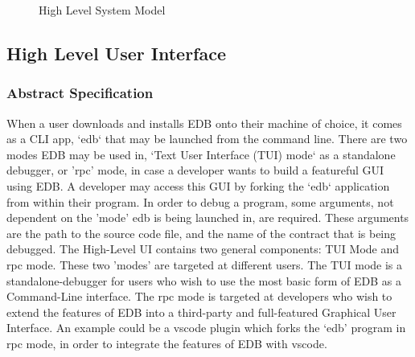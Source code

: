 \documentclass{report}
\begin{document}
\begin{figure}[!h]
    \vspace*{1cm}

    \caption{High Level System Model}
\end{figure}
\newpage

\subsection{High Level User Interface}
\subsubsection{Abstract Specification}
    When a user downloads and installs EDB onto their machine of choice, it comes as a CLI app, `edb` that may be launched from the command line. There are two modes EDB may be used in, `Text User Interface (TUI) mode` as a standalone debugger, or '\Gls{rpc}' mode, in case a developer wants to build a featureful GUI using EDB. A developer may access this GUI by forking the `edb` application from within their program. In order to debug a program, some arguments, not dependent on the 'mode' edb is being launched in, are required. These arguments are the path to the source code file, and the name of the contract that is being debugged. The High-Level UI contains two general components: TUI Mode and \Gls{rpc} mode. These two 'modes' are targeted at different users. The TUI mode is a standalone-debugger for users who wish to use the most basic form of EDB as a Command-Line interface. The \Gls{rpc} mode is targeted at developers who wish to extend the features of EDB into a third-party and full-featured Graphical User Interface. An example could be a \Gls{vscode} plugin which forks the `edb' program in \Gls{rpc} mode, in order to integrate the features of EDB with \Gls{vscode}.
\end{document}
